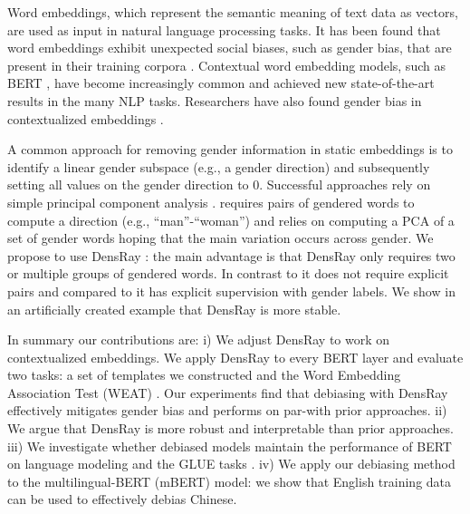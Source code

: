 Word embeddings, which represent the semantic meaning of text data as vectors, are used as input in natural language processing tasks. It has been found that word embeddings exhibit unexpected social biases, such as gender bias, that are present in their training corpora \citep{bolukbasi2016man, caliskan2017semantics,garg2018word}. Contextual word embedding models, such as BERT \citep{devlin2018bert}, have become increasingly common and achieved new state-of-the-art results in the many NLP tasks. Researchers have also found gender bias in contextualized embeddings \citep{zhao2019gender,may2019measuring}.

A common approach for removing gender information in static embeddings is to identify a linear gender subspace (e.g., a gender direction) and subsequently setting all values on the gender direction to 0. Successful approaches rely on simple principal component analysis \cite{bolukbasi2016man,mu2018all}. \citet{bolukbasi2016man} requires pairs of gendered words to compute a direction (e.g., ``man''-``woman'') and \citet{mu2018all} relies on computing a PCA of a set of gender words hoping that the main variation occurs across gender. We propose to use DensRay \citep{dufter2019analytical}: the main advantage is that DensRay only requires two or multiple groups of gendered words. In contrast to \cite{bolukbasi2016man} it does not require explicit pairs and compared to \cite{mu2018all} it has explicit supervision with gender labels. We show in an artificially created example that DensRay is more stable. 

In summary our contributions are: i) We adjust DensRay to work on contextualized embeddings. 
 We apply DensRay to every BERT layer and evaluate two tasks: a set of templates we constructed and the Word Embedding Association Test (WEAT) \citep{caliskan2017semantics}. Our experiments find that debiasing with DensRay effectively mitigates gender bias and performs on par-with prior approaches. ii) We argue that DensRay is more robust and interpretable than prior approaches.
iii) We investigate whether debiased models maintain the performance of BERT on language modeling and the GLUE tasks \citep{wang2018glue}. iv) We apply our debiasing method to the multilingual-BERT (mBERT) model: we show that English training data can be used to effectively debias Chinese.


